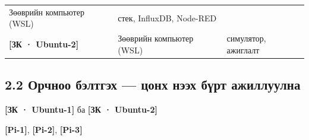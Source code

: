 \begin{longtable}[]{@{}lll@{}}
\begin{minipage}[t]{0.30\columnwidth}
Зөөврийн компьютер (WSL)\strut
\end{minipage} & \begin{minipage}[t]{0.30\columnwidth}\raggedright
стек, InfluxDB, Node-RED\strut
\end{minipage}\tabularnewline
\begin{minipage}[t]{0.30\columnwidth}\raggedright
\textbf{{[}ЗК · Ubuntu-2{]}}\strut
\end{minipage} & \begin{minipage}[t]{0.30\columnwidth}\raggedright
Зөөврийн компьютер (WSL)\strut
\end{minipage} & \begin{minipage}[t]{0.30\columnwidth}\raggedright
симулятор, ажиглалт\strut
\end{minipage}\tabularnewline
\bottomrule
\end{longtable}\endgroup

\hypertarget{ux43eux440ux447ux43dux43eux43e-ux431ux44dux43bux442ux433ux44dux445-ux446ux43eux43dux445-ux43dux44dux44dux445-ux431ux4afux440ux442-ux430ux436ux438ux43bux43bux443ux443ux43bux43dux430}{%
\subsection{\texorpdfstring{2.2 Орчноо бэлтгэх --- \textbf{цонх нээх бүрт} ажиллуулна}{2.2 Орчноо бэлтгэх --- цонх нээх бүрт ажиллуулна}}\label{ux43eux440ux447ux43dux43eux43e-ux431ux44dux43bux442ux433ux44dux445-ux446ux43eux43dux445-ux43dux44dux44dux445-ux431ux4afux440ux442-ux430ux436ux438ux43bux43bux443ux443ux43bux43dux430}}

\textbf{{[}ЗК · Ubuntu-1{]}} ба \textbf{{[}ЗК · Ubuntu-2{]}}

\begin{Shaded}
\begin{Highlighting}[]
\KeywordTok{\&\&} 
\end{Highlighting}
\end{Shaded}

\textbf{{[}Pi-1{]}}, \textbf{{[}Pi-2{]}}, \textbf{{[}Pi-3{]}}

\begin{Shaded}
\begin{Highlighting}[]
  \KeywordTok{\&\&} \KeywordTok{\&\&}  
 \StringTok{ / }
\end{Highlighting}
\end{Shaded}

